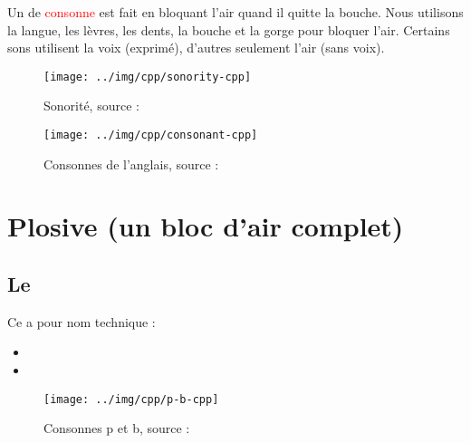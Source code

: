 Un \son de \textcolor{red}{consonne} est fait en bloquant l'air quand il quitte la
bouche. Nous utilisons la langue, les lèvres, les dents, la bouche et
la gorge pour bloquer l'air. Certains sons utilisent la voix
(exprimé), d'autres seulement l'air (sans voix).

\begin{center}
  \begin{figure}[h]
    \centering
    \texttt{[image: ../img/cpp/sonority-cpp]}
    \caption{Sonorité, source : \cpp}
    \label{fig:eng-cons}
  \end{figure}
\end{center}

\begin{center}
  \begin{figure}[h]
    \centering
    \texttt{[image: ../img/cpp/consonant-cpp]}
    \caption{Consonnes de l'anglais, source : \cpp}
    \label{fig:eng-cons}
  \end{figure}
\end{center}



\chapter{Plosive (un bloc d'air complet)}\label{chap:plosive}


\newpage
\minitoc
\newpage

\section{Le \son~ }\label{sec:p}

Ce \son a pour nom
technique :

\begin{itemize}
\item {}
\item {}
\end{itemize}

\begin{center}
  \begin{figure}[h]
    \centering
    \texttt{[image: ../img/cpp/p-b-cpp]}
    \caption{Consonnes p et b, source : \cpp}
    \label{fig:p-b}
  \end{figure}
\end{center}

